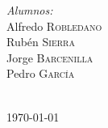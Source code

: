 \begin{titlepage}
\begin{minipage}{0.3\textwidth}
    \vspace*{0.1cm}

    \begin{flushleft} \large
    \emph{Alumnos:}\\
    Alfredo \textsc{Robledano}\\
    Rubén \textsc{Sierra}\\
    Jorge \textsc{Barcenilla}\\
    Pedro \textsc{García}\\
    
    \end{flushleft}
    
    \end{minipage}\\[1cm]
    
    
    
    {\large \today}\\[2cm] 
    
    \vfill 
\end{titlepage}
